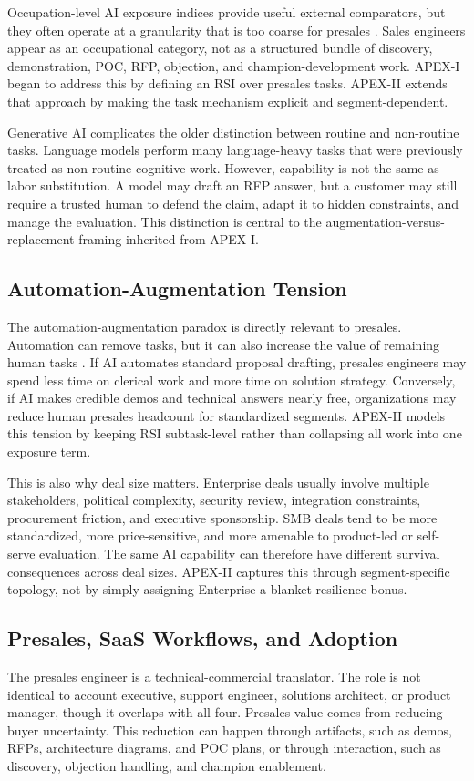 \documentclass[10pt,conference]{IEEEtran}
\begin{document}
Occupation-level AI exposure indices provide useful external comparators, but they often operate at a granularity that is too coarse for presales \cite{felten2021occupational,eloundou2023gpts}. Sales engineers appear as an occupational category, not as a structured bundle of discovery, demonstration, POC, RFP, objection, and champion-development work. APEX-I began to address this by defining an RSI over presales tasks. APEX-II extends that approach by making the task mechanism explicit and segment-dependent.

Generative AI complicates the older distinction between routine and non-routine tasks. Language models perform many language-heavy tasks that were previously treated as non-routine cognitive work. However, capability is not the same as labor substitution. A model may draft an RFP answer, but a customer may still require a trusted human to defend the claim, adapt it to hidden constraints, and manage the evaluation. This distinction is central to the augmentation-versus-replacement framing inherited from APEX-I.

\subsection{Automation-Augmentation Tension}
The automation-augmentation paradox is directly relevant to presales. Automation can remove tasks, but it can also increase the value of remaining human tasks \cite{raisch2021artificial}. If AI automates standard proposal drafting, presales engineers may spend less time on clerical work and more time on solution strategy. Conversely, if AI makes credible demos and technical answers nearly free, organizations may reduce human presales headcount for standardized segments. APEX-II models this tension by keeping RSI subtask-level rather than collapsing all work into one exposure term.

This is also why deal size matters. Enterprise deals usually involve multiple stakeholders, political complexity, security review, integration constraints, procurement friction, and executive sponsorship. SMB deals tend to be more standardized, more price-sensitive, and more amenable to product-led or self-serve evaluation. The same AI capability can therefore have different survival consequences across deal sizes. APEX-II captures this through segment-specific topology, not by simply assigning Enterprise a blanket resilience bonus.

\subsection{Presales, SaaS Workflows, and Adoption}
The presales engineer is a technical-commercial translator. The role is not identical to account executive, support engineer, solutions architect, or product manager, though it overlaps with all four. Presales value comes from reducing buyer uncertainty. This reduction can happen through artifacts, such as demos, RFPs, architecture diagrams, and POC plans, or through interaction, such as discovery, objection handling, and champion enablement.
\end{document}
